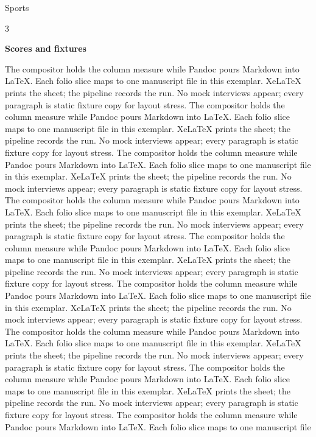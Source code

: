 \documentclass[
  ignorenonframetext,
]{beamer}
\author{\texorpdfstring{}{}}
\date{}
\begin{document}
\begin{frame}{Sports}
\protect{}\label{sports}
\begin{multicols}{3}

\textbf{Scores and fixtures}

The compositor holds the column measure while Pandoc pours Markdown into
LaTeX. Each folio slice maps to one manuscript file in this exemplar.
XeLaTeX prints the sheet; the pipeline records the run. No mock
interviews appear; every paragraph is static fixture copy for layout
stress. The compositor holds the column measure while Pandoc pours
Markdown into LaTeX. Each folio slice maps to one manuscript file in
this exemplar. XeLaTeX prints the sheet; the pipeline records the run.
No mock interviews appear; every paragraph is static fixture copy for
layout stress. The compositor holds the column measure while Pandoc
pours Markdown into LaTeX. Each folio slice maps to one manuscript file
in this exemplar. XeLaTeX prints the sheet; the pipeline records the
run. No mock interviews appear; every paragraph is static fixture copy
for layout stress. The compositor holds the column measure while Pandoc
pours Markdown into LaTeX. Each folio slice maps to one manuscript file
in this exemplar. XeLaTeX prints the sheet; the pipeline records the
run. No mock interviews appear; every paragraph is static fixture copy
for layout stress. The compositor holds the column measure while Pandoc
pours Markdown into LaTeX. Each folio slice maps to one manuscript file
in this exemplar. XeLaTeX prints the sheet; the pipeline records the
run. No mock interviews appear; every paragraph is static fixture copy
for layout stress. The compositor holds the column measure while Pandoc
pours Markdown into LaTeX. Each folio slice maps to one manuscript file
in this exemplar. XeLaTeX prints the sheet; the pipeline records the
run. No mock interviews appear; every paragraph is static fixture copy
for layout stress. The compositor holds the column measure while Pandoc
pours Markdown into LaTeX. Each folio slice maps to one manuscript file
in this exemplar. XeLaTeX prints the sheet; the pipeline records the
run. No mock interviews appear; every paragraph is static fixture copy
for layout stress. The compositor holds the column measure while Pandoc
pours Markdown into LaTeX. Each folio slice maps to one manuscript file
in this exemplar. XeLaTeX prints the sheet; the pipeline records the
run. No mock interviews appear; every paragraph is static fixture copy
for layout stress. The compositor holds the column measure while Pandoc
pours Markdown into LaTeX. Each folio slice maps to one manuscript file

\end{multicols}
\end{frame}
\end{document}
